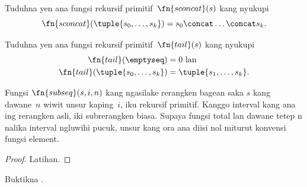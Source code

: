 \documentclass[../../../include/open-logic-section]{subfiles}
\begin{document}
\begin{prob}
Tuduhna yen ana fungsi rekursif primitif~$\fn{sconcat}(s)$
kang nyukupi
\[
\fn{sconcat}(\tuple{s_0, \dots, s_k}) = s_0 \concat \dots \concat s_k.
\]
\end{prob}

\begin{prob}
Tuduhna yen ana fungsi rekursif primitif~$\fn{tail}(s)$
kang nyukupi
\begin{align*}
  \fn{tail}(\emptyseq) & = 0 \text{ lan}\\
  \fn{tail}(\tuple{s_0, \dots, s_{k}}) & = \tuple{s_1, \dots, s_{k}}.
\end{align*}
\end{prob}

\begin{prop}
  Fungsi $\fn{subseq}(s, i, n)$ kang ngasilake
  rerangken bagean saka $s$ kang dawane~$n$ wiwit
  unsur kaping~$i$, iku rekursif primitif. Kanggo interval kang ana ing rerangken asli, iki subrerangken biasa. Supaya fungsi total lan dawane tetep n nalika interval ngluwihi pucuk, unsur kang ora ana diisi nol miturut konvensi fungsi element.
\end{prop}

\begin{proof}
  Latihan.
\end{proof}

\begin{prob}
  Buktikna .
\end{prob}
  
\end{document}
